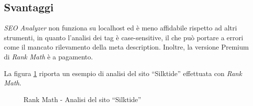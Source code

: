 \subsection{Svantaggi}
\textit{SEO Analyzer} non funziona su \gls{localhost} ed è meno affidabile rispetto ad altri strumenti, in quanto l'analisi dei tag è \gls{case-sensitive}, il che può portare a errori come il mancato rilevamento della meta description. Inoltre, la versione Premium di \textit{Rank Math} è a pagamento. 

\vspace{15pt}
\noindent La figura \ref{fig:rank_math_silktide} riporta un esempio di analisi del sito “Silktide” effettuata con \textit{Rank Math}.

\begin{figure}[H]
    \centering 
    \caption{Rank Math - Analisi del sito “Silktide”}
    \label{fig:rank_math_silktide}
\end{figure}